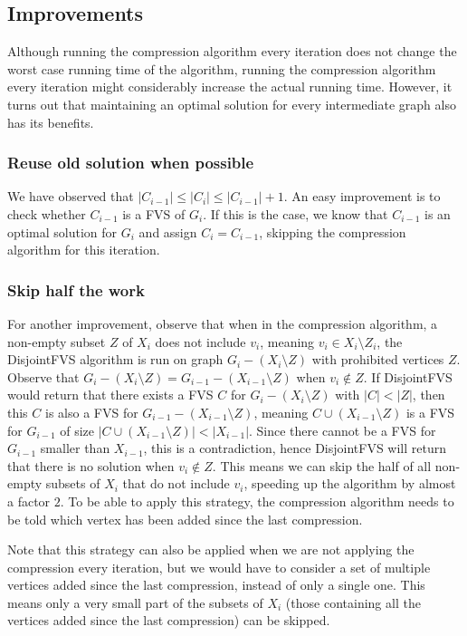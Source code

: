 \subsection{Improvements}
Although running the compression algorithm every iteration does not change the worst case
running time of the algorithm, running the compression algorithm every iteration might considerably increase the actual
running time. However, it turns out that maintaining an optimal solution for every intermediate graph also has its
benefits. 

\subsubsection{Reuse old solution when possible}
We have observed that $|C_{i-1}| \leq |C_i| \leq |C_{i-1}|+1$. An easy
improvement is to check whether $C_{i-1}$ is a FVS of $G_i$. If this is the case, we know that $C_{i-1}$ is an optimal
solution for $G_i$ and assign $C_i = C_{i-1}$, skipping the compression algorithm for this iteration.

\subsubsection{Skip half the work}
For another improvement, observe that when in the compression algorithm, a non-empty
subset $Z$ of $X_i$ does not include $v_i$, meaning $v_i \in X_i\setminus Z_i$, the {\sc DisjointFVS} algorithm is run
on graph $G_i-(X_i\setminus Z)$ with prohibited vertices $Z$. Observe that $G_i-(X_i\setminus Z) =
G_{i-1}-(X_{i-1}\setminus Z)$ when $v_i \not\in Z$. If {\sc DisjointFVS} would return that there exists a FVS $C$ for
$G_i-(X_i\setminus Z)$ with $|C|<|Z|$, then this $C$ is also a FVS for $G_{i-1}-(X_{i-1}\setminus Z)$, meaning $C \cup
(X_{i-1}\setminus Z)$ is a FVS for $G_{i-1}$ of size $|C \cup (X_{i-1}\setminus Z)| < |X_{i-1}|$. Since there cannot be
a FVS for $G_{i-1}$ smaller than $X_{i-1}$, this is a contradiction, hence {\sc DisjointFVS} will return that there is
no solution when $v_i \not\in Z$. This means we can skip the half of all non-empty subsets of $X_i$ that do not include
$v_i$, speeding up the algorithm by almost a factor $2$. To be able to apply this strategy, the compression algorithm
needs to be told which vertex has been added since the last compression.

Note that this strategy can also be applied when we are not applying the compression every iteration, but we would have
to consider a set of multiple vertices added since the last compression, instead of only a single one. This means only a
very small part of the subsets of $X_i$ (those containing all the vertices added since the last compression) can be
skipped.

